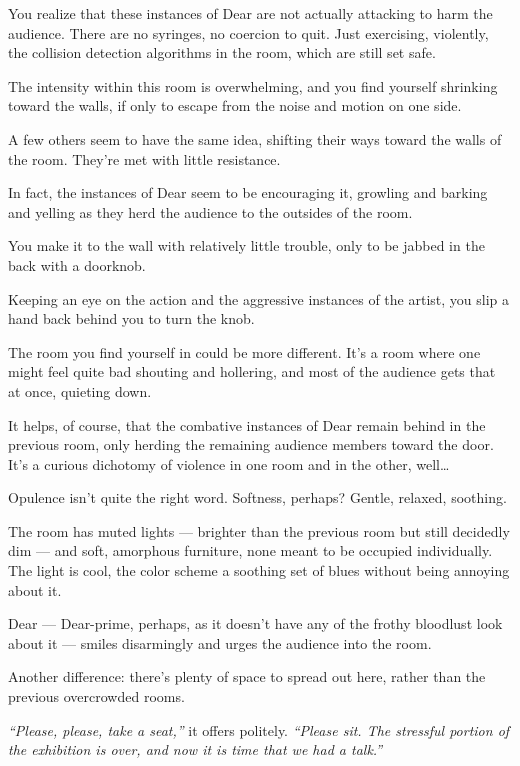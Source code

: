You realize that these instances of Dear are not actually attacking to harm the audience. There are no syringes, no coercion to quit. Just exercising, violently, the collision detection algorithms in the room, which are still set safe.

The intensity within this room is overwhelming, and you find yourself shrinking toward the walls, if only to escape from the noise and motion on one side.

A few others seem to have the same idea, shifting their ways toward the walls of the room. They're met with little resistance.

In fact, the instances of Dear seem to be encouraging it, growling and barking and yelling as they herd the audience to the outsides of the room.

You make it to the wall with relatively little trouble, only to be jabbed in the back with a doorknob.

Keeping an eye on the action and the aggressive instances of the artist, you slip a hand back behind you to turn the knob.

\newpage

The room you find yourself in could be more different. It's a room where one might feel quite bad shouting and hollering, and most of the audience gets that at once, quieting down.

It helps, of course, that the combative instances of Dear remain behind in the previous room, only herding the remaining audience members toward the door. It's a curious dichotomy of violence in one room and in the other, well\ldots{}

Opulence isn't quite the right word. Softness, perhaps? Gentle, relaxed, soothing.

The room has muted lights --- brighter than the previous room but still decidedly dim --- and soft, amorphous furniture, none meant to be occupied individually. The light is cool, the color scheme a soothing set of blues without being annoying about it.

Dear --- Dear-prime, perhaps, as it doesn't have any of the frothy bloodlust look about it --- smiles disarmingly and urges the audience into the room.

Another difference: there's plenty of space to spread out here, rather than the previous overcrowded rooms.

\emph{``Please, please, take a seat,''} it offers politely. \emph{``Please sit. The stressful portion of the exhibition is over, and now it is time that we had a talk.''}

